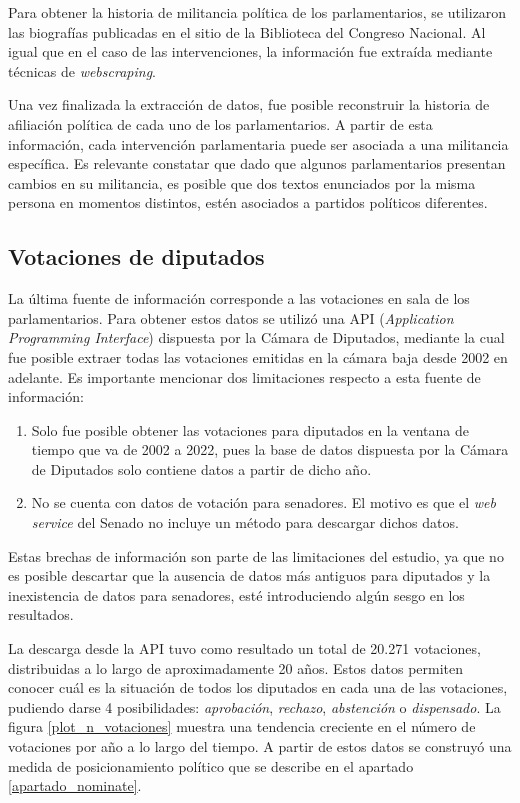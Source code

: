 \documentclass[
  12pt,
]{article}
\begin{document}
Para obtener la historia de militancia política de los parlamentarios,
se utilizaron las biografías publicadas en el sitio de la Biblioteca del
Congreso Nacional. Al igual que en el caso de las intervenciones, la
información fue extraída mediante técnicas de \emph{webscraping}.

Una vez finalizada la extracción de datos, fue posible reconstruir la
historia de afiliación política de cada uno de los parlamentarios. A
partir de esta información, cada intervención parlamentaria puede ser
asociada a una militancia específica. Es relevante constatar que dado
que algunos parlamentarios presentan cambios en su militancia, es
posible que dos textos enunciados por la misma persona en momentos
distintos, estén asociados a partidos políticos diferentes.

\hypertarget{votaciones-de-diputados}{%
\subsection{Votaciones de diputados}\label{votaciones-de-diputados}}

La última fuente de información corresponde a las votaciones en sala de
los parlamentarios. Para obtener estos datos se utilizó una API
(\emph{Application Programming Interface}) dispuesta por la Cámara de
Diputados, mediante la cual fue posible extraer todas las votaciones
emitidas en la cámara baja desde 2002 en adelante. Es importante
mencionar dos limitaciones respecto a esta fuente de información:

\begin{enumerate}
\def\labelenumi{\arabic{enumi}.}
\item
  Solo fue posible obtener las votaciones para diputados en la ventana
  de tiempo que va de 2002 a 2022, pues la base de datos dispuesta por
  la Cámara de Diputados solo contiene datos a partir de dicho año.
\item
  No se cuenta con datos de votación para senadores. El motivo es que el
  \emph{web service} del Senado no incluye un método para descargar
  dichos datos.
\end{enumerate}

Estas brechas de información son parte de las limitaciones del estudio,
ya que no es posible descartar que la ausencia de datos más antiguos
para diputados y la inexistencia de datos para senadores, esté
introduciendo algún sesgo en los resultados.

La descarga desde la API tuvo como resultado un total de 20.271
votaciones, distribuidas a lo largo de aproximadamente 20 años. Estos
datos permiten conocer cuál es la situación de todos los diputados en
cada una de las votaciones, pudiendo darse 4 posibilidades:
\emph{aprobación}, \emph{rechazo}, \emph{abstención} o
\emph{dispensado}. La figura \ref{plot_n_votaciones} muestra una
tendencia creciente en el número de votaciones por año a lo largo del
tiempo. A partir de estos datos se construyó una medida de
posicionamiento político que se describe en el apartado
\ref{apartado_nominate}.
\end{document}
